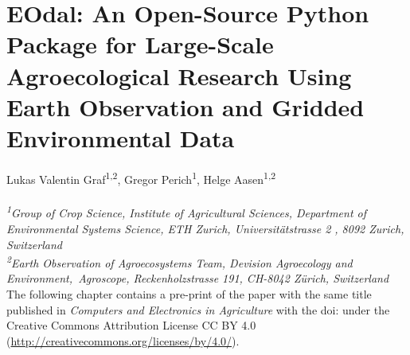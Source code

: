 \chapter{EOdal: An Open-Source Python Package for Large-Scale Agroecological Research Using Earth Observation and Gridded Environmental Data}
\label{chap:eodal}
\graphicspath{{./02-EOdal/img}}

Lukas Valentin Graf\textsuperscript{1,2}, Gregor Perich\textsuperscript{1}, Helge Aasen\textsuperscript{1,2}
\\
\normalsize
\vspace{2pt}
\\
\textit{\textsuperscript{1}Group of Crop Science, Institute of Agricultural Sciences, Department of Environmental Systems Science, ETH Zurich, Universitätstrasse 2 , 8092 Zurich, Switzerland
\\
\textsuperscript{2}Earth Observation of Agroecosystems Team, Devision Agroecology and Environment,\ Agroscope, Reckenholzstrasse 191, CH-8042 Zürich, Switzerland
\vspace{2cm}}
\\

The following chapter contains a pre-print of the paper with the same title published in \textsl{Computers and Electronics in Agriculture} with the doi:  under the Creative Commons Attribution License CC BY 4.0 (\url{http://creativecommons.org/licenses/by/4.0/}).


